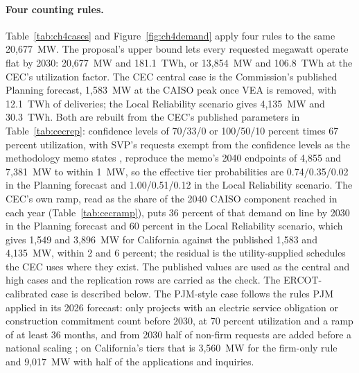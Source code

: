 \paragraph{Four counting rules.} Table~\ref{tab:ch4cases} and Figure~\ref{fig:ch4demand} apply four rules to the same 20,677~MW. The proposal's upper bound lets every requested megawatt operate flat by 2030: 20,677~MW and 181.1~TWh, or 13,854~MW and 106.8~TWh at the CEC's utilization factor. The CEC central case is the Commission's published Planning forecast, 1,583~MW at the CAISO peak once VEA is removed, with 12.1~TWh of deliveries; the Local Reliability scenario gives 4,135~MW and 30.3~TWh. Both are rebuilt from the CEC's published parameters in Table~\ref{tab:cecrep}: confidence levels of 70/33/0 or 100/50/10 percent times 67 percent utilization, with SVP's requests exempt from the confidence levels as the methodology memo states \citep{cec_dc_memo2026}, reproduce the memo's 2040 endpoints of 4,855 and 7,381~MW to within 1~MW, so the effective tier probabilities are 0.74/0.35/0.02 in the Planning forecast and 1.00/0.51/0.12 in the Local Reliability scenario. The CEC's own ramp, read as the share of the 2040 CAISO component reached in each year (Table~\ref{tab:cecramp}), puts 36 percent of that demand on line by 2030 in the Planning forecast and 60 percent in the Local Reliability scenario, which gives 1,549 and 3,896~MW for California against the published 1,583 and 4,135~MW, within 2 and 6 percent; the residual is the utility-supplied schedules the CEC uses where they exist. The published values are used as the central and high cases and the replication rows are carried as the check. The ERCOT-calibrated case is described below. The PJM-style case follows the rules PJM applied in its 2026 forecast: only projects with an electric service obligation or construction commitment count before 2030, at 70 percent utilization and a ramp of at least 36 months, and from 2030 half of non-firm requests are added before a national scaling \citep{pjm_lar2025,pjm_loadreport2026}; on California's tiers that is 3,560~MW for the firm-only rule and 9,017~MW with half of the applications and inquiries.

\begin{table}[H]
\centering\scriptsize
\caption{Data center demand added by 2030 under each counting rule (California-only tiers). Energy uses a 0.88 load factor except where the CEC's published deliveries are used. Ramps are the share of realized capacity on line by the end of 2030.}
\label{tab:ch4cases}
\resizebox{\textwidth}{!}{}
\end{table}

